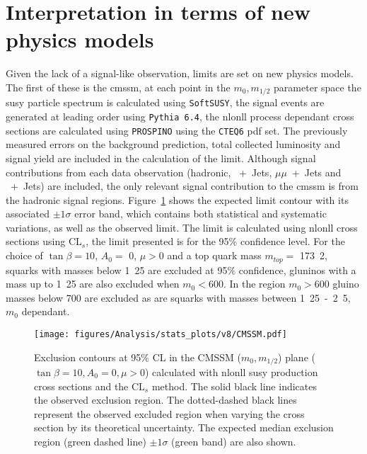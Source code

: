 \section{Interpretation in terms of new physics models} %
\label{cha:interpretation_in_terms_of_new_physics_models_}
Given the lack of a signal-like observation, limits are set on new physics 
models. The first of these is the \ac{cmssm}, at each point in the $m_{0}, 
m_{1/2}$ parameter space the \ac{susy} particle spectrum is calculated using 
\texttt{SoftSUSY}\cite{Allanach:2001kg}, the signal events are generated at 
leading order using \texttt{Pythia 6.4}\cite{pythia}, the \ac{nlonll} process 
dependant cross sections are calculated using 
\texttt{PROSPINO}\cite{Beenakker:1996ch} using the \texttt{CTEQ6}\cite{cteq6.1} 
\ac{pdf} set. The previously measured errors on the background prediction, 
total collected luminosity and signal yield are included in the calculation of 
the limit. Although signal contributions from each data observation (hadronic, 
\Pmu~+~Jets, $\mu\mu$~+~Jets and \Pphoton~+~Jets) are included, the only 
relevant signal contribution to the \ac{cmssm} is from the hadronic signal 
regions.
Figure~\ref{fig:cmssm-limit} shows the expected limit contour with its 
associated $\pm1\sigma$ error band, which contains both statistical and 
systematic variations, as well as the observed limit. The limit is 
calculated using \ac{nlonll} cross sections using CL$_s$\cite{cls-pdg}, the 
limit presented is for the 95$\%$ confidence level. For the choice of 
$\tan\beta = 10$, $A_0 = $ \unit{0}{\GeV}, $\mu > 0$ and a top quark mass 
$m_{top} = $ \unit{173.2}{\GeV}, squarks with masses below \unit{1.25}{\TeV} 
are excluded at 95$\%$ confidence, gluninos with a mass up to \unit{1.25}{\TeV} 
are also excluded when $m_{0} < $\unit{600}{\GeV}. In the region $m_{0} > 
$\unit{600}{\GeV} gluino masses below \unit{700}{\GeV} are excluded as are 
squarks with masses between \unit{1.25-2.5}{\TeV}, $m_{0}$ dependant.

\begin{figure}[h!]
  \begin{center}
    \texttt{[image: figures/Analysis/stats\_plots/v8/CMSSM.pdf]}
    \caption{\label{fig:cmssm-limit} Exclusion contours at 95$\%$ CL in
      the CMSSM ($m_0, m_{1/2}$) plane ($\tan \beta = 10, A_0 = 0, \mu
      > 0$) calculated with \ac{nlonll} \ac{susy} production cross sections and
      the CL$_{s}$ method. The solid black line indicates the observed
      exclusion region. The dotted-dashed black lines represent the
      observed excluded region when varying the cross section by its
      theoretical uncertainty. The expected median exclusion region
      (green dashed line) $\pm 1 \sigma$ (green band) are also shown.}
  \end{center}
\end{figure}


